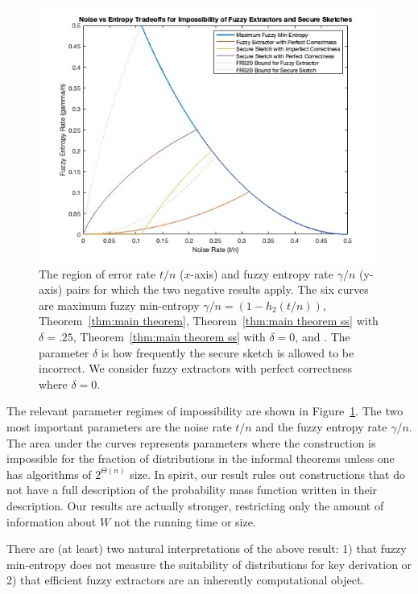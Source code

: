 \begin{figure}[t]
\centering
\includegraphics[width=.9\textwidth]{EntropyvsError.jpg}
\caption{The region of error rate $t/n$ ($x$-axis) and fuzzy entropy rate $\gamma/n$ (y-axis) pairs for which the two negative results apply.  The six curves are maximum fuzzy min-entropy $\gamma/n = (1-h_2(t/n))$, Theorem~\ref{thm:main theorem}, Theorem~\ref{thm:main theorem ss} with $\delta=.25$,  Theorem~\ref{thm:main theorem ss} with $\delta =0$, \cite[Theorem 5.1]{fuller2020fuzzy} and \cite[Theorem 7.2]{fuller2020fuzzy}. The parameter $\delta$ is how frequently the secure sketch is allowed to be incorrect.  We consider fuzzy extractors with perfect correctness where $\delta=0$.}
\label{fig:param regime}
\end{figure}
 The relevant parameter regimes of impossibility are shown in Figure~\ref{fig:param regime}.  The two most important parameters are the noise rate $t/n$ and the fuzzy entropy rate $\gamma/n$. The area under the curves represents parameters where the construction is impossible for the fraction of distributions in the informal theorems unless one has algorithms of $2^{\Theta(n)}$ size.
In spirit, our result rules out constructions that do not have a full description of the probability mass function written in their description.  Our results are actually stronger, restricting only the amount of information about $W$ not the running time or size.  


There are (at least) two natural interpretations of the above result: 1) that fuzzy min-entropy does not measure the suitability of distributions for key derivation or 2) that efficient fuzzy extractors are an inherently computational object.

